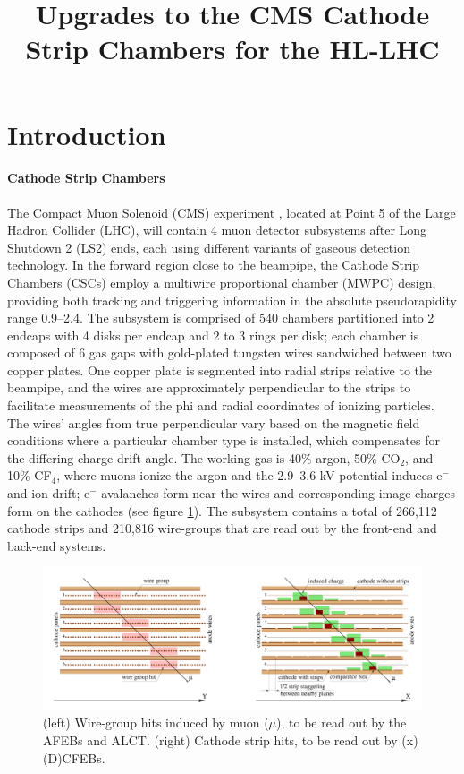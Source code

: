 \documentclass[a4paper,11pt]{article}
\title{Upgrades to the CMS Cathode Strip Chambers for the HL-LHC}
\affiliation{University of California, Riverside, USA}
\begin{document}
\maketitle
\flushbottom

\section{Introduction}
\label{sec:intro}
\paragraph{Cathode Strip Chambers}
The Compact Muon Solenoid (CMS) experiment \cite{detector}, located at Point 5 of the Large Hadron Collider (LHC), will contain 4 muon detector subsystems after Long Shutdown 2 (LS2) ends, each using different variants of gaseous detection technology.
In the forward region close to the beampipe, the Cathode Strip Chambers (CSCs) employ a multiwire proportional chamber (MWPC) design, providing both tracking and triggering information in the absolute pseudorapidity range 0.9--2.4.
The subsystem is comprised of 540 chambers partitioned into 2 endcaps with 4 disks per endcap and 2 to 3 rings per disk; each chamber is composed of 6 gas gaps with gold-plated tungsten wires sandwiched between two copper plates.
One copper plate is segmented into radial strips relative to the beampipe, and the wires are approximately perpendicular to the strips to facilitate measurements of the phi and radial coordinates of ionizing particles. The wires' angles from true perpendicular vary based on the magnetic field conditions where a particular chamber type is installed, which compensates for the differing charge drift angle. The working gas is 40\% argon, 50\% CO$_{2}$, and 10\% CF$_{4}$, where muons ionize the argon and the 2.9--3.6 kV potential induces e$^-$ and ion drift; e$^-$ avalanches form near the wires and corresponding image charges form on the cathodes (see figure \ref{fig:csc}). The subsystem contains a total of 266,112 cathode strips and 210,816 wire-groups that are read out by the front-end and back-end systems.
\begin{figure}[htbp]
\centering %
\includegraphics[width=1\textwidth]{CSC.png}
\caption{\label{fig:csc} (left) Wire-group hits induced by muon ($\mu$), to be read out by the AFEBs and ALCT. (right) Cathode strip hits, to be read out by (x)(D)CFEBs.}
\end{figure}
\end{document}
